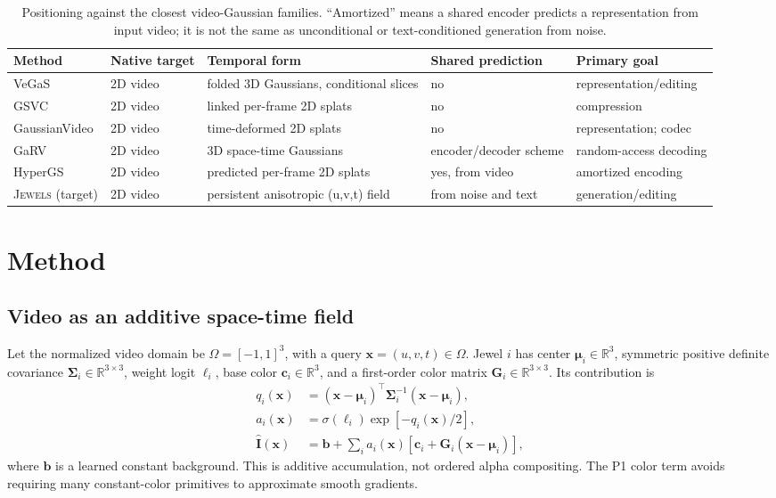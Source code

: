 \documentclass[10pt]{article}
\newcommand{\jewels}{\textsc{Jewels}}
\newcommand{\uvt}{(u,v,t)}
\newcommand{\R}{\mathbb{R}}
\begin{document}
\begin{table}[H]
\centering
\footnotesize
\caption{Positioning against the closest video-Gaussian families. ``Amortized'' means a shared
encoder predicts a representation from input video; it is not the same as unconditional or
text-conditioned generation from noise.}
\label{tab:related}
\begin{tabularx}{\linewidth}{@{}lXXXX@{}}
\toprule
Method & Native target & Temporal form & Shared prediction & Primary goal \\
\midrule
VeGaS & 2D video & folded 3D Gaussians, conditional slices & no & representation/editing \\
GSVC & 2D video & linked per-frame 2D splats & no & compression \\
GaussianVideo & 2D video & time-deformed 2D splats & no & representation; codec \\
GaRV & 2D video & 3D space-time Gaussians & encoder/decoder scheme & random-access decoding \\
HyperGS & 2D video & predicted per-frame 2D splats & yes, from video & amortized encoding \\
\jewels{} (target) & 2D video & persistent anisotropic \uvt{} field & from noise and text & generation/editing \\
\bottomrule
\end{tabularx}
\end{table}

\section{Method}

\subsection{Video as an additive space-time field}

Let the normalized video domain be $\Omega=[-1,1]^3$, with a query
$\mathbf{x}=(u,v,t)\in\Omega$. Jewel $i$ has center $\boldsymbol\mu_i\in\R^3$, symmetric positive
definite covariance $\boldsymbol\Sigma_i\in\R^{3\times3}$, weight logit $\ell_i$, base color
$\mathbf{c}_i\in\R^3$, and a first-order color matrix
$\mathbf{G}_i\in\R^{3\times3}$. Its contribution is
\begin{align}
q_i(\mathbf{x}) &= (\mathbf{x}-\boldsymbol\mu_i)^\top
\boldsymbol\Sigma_i^{-1}(\mathbf{x}-\boldsymbol\mu_i),\\
a_i(\mathbf{x}) &= \sigma(\ell_i)\exp[-q_i(\mathbf{x})/2],\\
\widehat{\mathbf{I}}(\mathbf{x}) &= \mathbf{b}+\sum_i a_i(\mathbf{x})
\left[\mathbf{c}_i+\mathbf{G}_i(\mathbf{x}-\boldsymbol\mu_i)\right],
\label{eq:renderer}
\end{align}
where $\mathbf{b}$ is a learned constant background. This is additive accumulation, not ordered
alpha compositing. The P1 color term avoids requiring many constant-color primitives to approximate
smooth gradients.
\end{document}
